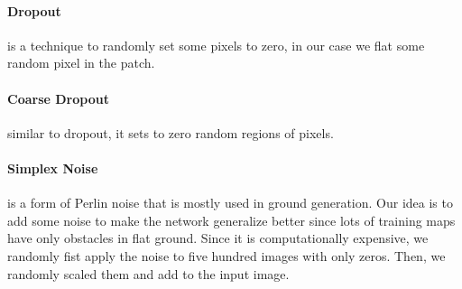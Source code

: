 \documentclass[../document.tex]{subfiles}
\begin{document}
\paragraph{Dropout} is a technique to randomly set some pixels to zero, in our case we flat some random pixel in the patch. 
\paragraph{Coarse Dropout} similar to dropout, it sets to zero random regions of pixels.
\paragraph{Simplex Noise} is a form of Perlin noise that is mostly used in ground generation. Our idea is to add some noise to make the network generalize better since lots of training maps have only obstacles in flat ground. Since it is computationally expensive, we randomly fist apply the noise to five hundred images with only zeros. Then, we randomly scaled them and add to the input image.
\end{document}
